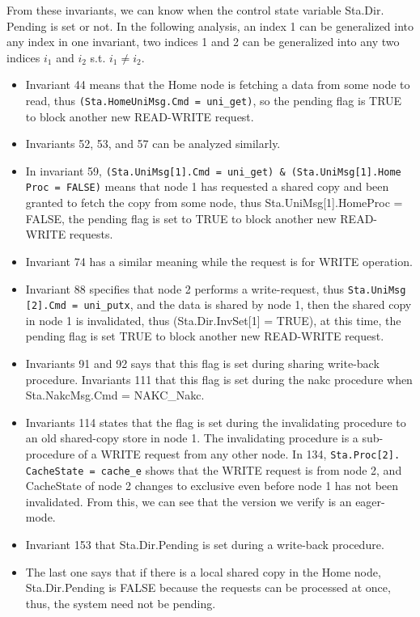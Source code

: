 \documentclass{llncs-new}
\begin{document}
From these invariants, we can know when the control state variable Sta.Dir.  Pending is set or not. In the following analysis, an index 1 can be generalized into any index in one invariant,  two indices 1 and 2 can be generalized into any two indices $i_1$ and $i_2$ s.t. $i_1 \neq i_2$.
\begin{itemize}
 \item Invariant 44 means that the Home node is fetching a data from some node to read, thus {\tt (Sta.HomeUniMsg.Cmd = uni\_get)}, so the pending flag is  TRUE to block another new READ-WRITE request.
 \item Invariants 52, 53, and 57 can be analyzed similarly.
 \item In invariant 59, {\tt (Sta.UniMsg[1].Cmd = uni\_get) \& (Sta.UniMsg[1].Home} {\tt Proc = FALSE)} means that node 1 has requested a shared copy and been granted to fetch the copy from some node, thus Sta.UniMsg[1].HomeProc = FALSE, the pending flag is set to TRUE to block another new READ-WRITE requests.
  \item    Invariant 74 has a similar meaning while the request is for WRITE operation.

  \item    Invariant 88 specifies that node 2 performs a write-request, thus {\tt Sta.UniMsg} {\tt[2].Cmd = uni\_putx}, and the data is shared by node 1, then the shared copy in node 1 is invalidated, thus (Sta.Dir.InvSet[1] = TRUE), at this time,  the pending flag is set TRUE to block another new READ-WRITE request.

  \item   Invariants 91 and 92 says that this flag is set during sharing write-back procedure. Invariants 111  that this flag is set during the nakc procedure when  Sta.NakcMsg.Cmd = NAKC\_Nakc.

   \item     Invariants 114 states that the flag is set during the invalidating procedure to an old shared-copy store in node 1. The invalidating procedure is a sub-procedure  of a WRITE request from any other node. In 134, {\tt Sta.Proc[2].} {\tt CacheState = cache\_e} shows that the WRITE request is from node 2, and CacheState of node 2 changes to exclusive even before node 1 has not been invalidated. From this, we can see that the version we verify is an eager-mode.

   \item       Invariant 153 that Sta.Dir.Pending is set during a write-back procedure.

  \item  The last one says that if there is a  local shared copy in the Home node, Sta.Dir.Pending is FALSE because the   requests can be processed at once, thus, the system need not be pending.
\end{itemize}
\end{document}
